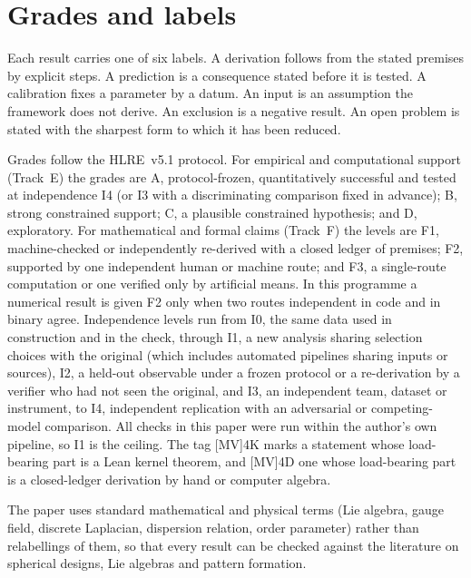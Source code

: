 \documentclass[a4paper,11pt]{article}
\numberwithin{equation}{section}
\theoremstyle{jsplain}
\theoremstyle{jsrem}
\begin{document}
\section{Grades and labels}\label{app:grades}

Each result carries one of six labels. A derivation follows from the stated premises by explicit steps. A prediction is a consequence stated before it is tested. A calibration fixes a parameter by a datum. An input is an assumption the framework does not derive. An exclusion is a negative result. An open problem is stated with the sharpest form to which it has been reduced.

Grades follow the HLRE~v5.1 protocol. For empirical and computational support (Track~E) the grades are A, protocol-frozen, quantitatively successful and tested at independence I4 (or I3 with a discriminating comparison fixed in advance); B, strong constrained support; C, a plausible constrained hypothesis; and D, exploratory. For mathematical and formal claims (Track~F) the levels are F1, machine-checked or independently re-derived with a closed ledger of premises; F2, supported by one independent human or machine route; and F3, a single-route computation or one verified only by artificial means. In this programme a numerical result is given F2 only when two routes independent in code and in binary agree. Independence levels run from I0, the same data used in construction and in the check, through I1, a new analysis sharing selection choices with the original (which includes automated pipelines sharing inputs or sources), I2, a held-out observable under a frozen protocol or a re-derivation by a verifier who had not seen the original, and I3, an independent team, dataset or instrument, to I4, independent replication with an adversarial or competing-model comparison. All checks in this paper were run within the author's own pipeline, so I1 is the ceiling. The tag [MV]4K marks a statement whose load-bearing part is a Lean kernel theorem, and [MV]4D one whose load-bearing part is a closed-ledger derivation by hand or computer algebra.

The paper uses standard mathematical and physical terms (Lie algebra, gauge field, discrete Laplacian, dispersion relation, order parameter) rather than relabellings of them, so that every result can be checked against the literature on spherical designs, Lie algebras and pattern formation.
\end{document}
